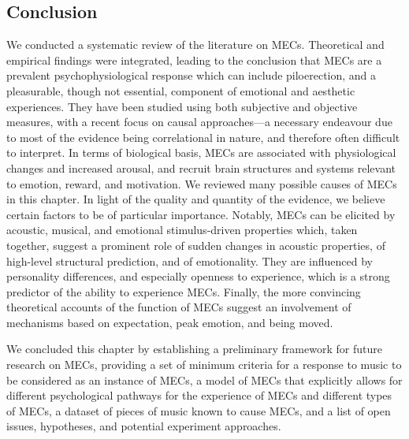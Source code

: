 \subsection{Conclusion}

We conducted a systematic review of the literature on MECs. Theoretical and empirical findings were integrated, leading to the conclusion that MECs are a prevalent psychophysiological response which can include piloerection, and a pleasurable, though not essential, component of emotional and aesthetic experiences. They have been studied using both subjective and objective measures, with a recent focus on causal approaches---a necessary endeavour due to most of the evidence being correlational in nature, and therefore often difficult to interpret. In terms of biological basis, MECs are associated with physiological changes and increased arousal, and recruit brain structures and systems relevant to emotion, reward, and motivation. We reviewed many possible causes of MECs in this chapter. In light of the quality and quantity of the evidence, we believe certain factors to be of particular importance. Notably, MECs can be elicited by acoustic, musical, and emotional stimulus-driven properties which, taken together, suggest a prominent role of sudden changes in acoustic properties, of high-level structural prediction, and of emotionality. They are influenced by personality differences, and especially openness to experience, which is a strong predictor of the ability to experience MECs. Finally, the more convincing theoretical accounts of the function of MECs suggest an involvement of mechanisms based on expectation, peak emotion, and being moved.

We concluded this chapter by establishing a preliminary framework for future research on MECs, providing a set of minimum criteria for a response to music to be considered as an instance of MECs, a model of MECs that explicitly allows for different psychological pathways for the experience of MECs and different types of MECs, a dataset of pieces of music known to cause MECs, and a list of open issues, hypotheses, and potential experiment approaches.
